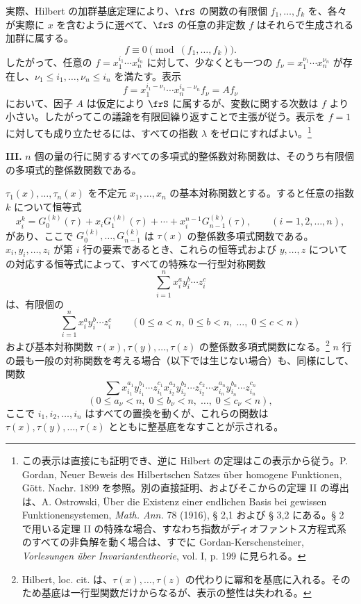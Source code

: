 \documentclass[11pt]{article}
\begin{document}
実際、Hilbert の加群基底定理により、\(\frS\) の関数の有限個 \(f_1,\ldots,f_k\) を、各々が実際に \(x\) を含むように選べて、\(\frS\) の任意の非定数 \(f\) はそれらで生成される加群に属する。
\[
        f\equiv0\pmod{(f_1,\ldots,f_k)}.
\]
したがって、任意の \(f=x_1^{i_1}\cdots x_n^{i_n}\) に対して、少なくとも一つの \(f_\nu=x_1^{\nu_1}\cdots x_n^{\nu_n}\) が存在し、\(\nu_1\le i_1,\ldots,\nu_n\le i_n\) を満たす。表示
\[
        f=x_1^{i_1-\nu_1}\cdots x_n^{i_n-\nu_n} f_\nu = A f_\nu
\]
において、因子 \(A\) は仮定により \(\frS\) に属するが、変数に関する次数は \(f\) より小さい。したがってこの議論を有限回繰り返すことで主張が従う。表示を \(f=1\) に対しても成り立たせるには、すべての指数 \(\lambda\) をゼロにすればよい。\footnote{この表示は直接にも証明でき、逆に Hilbert の定理はこの表示から従う。P. Gordan, Neuer Beweis des Hilbertschen Satzes über homogene Funktionen, Gött. Nachr. 1899 を参照。別の直接証明、およびそこからの定理 II の導出は、A. Ostrowski, Über die Existenz einer endlichen Basis bei gewissen Funktionensystemen, \emph{Math. Ann.} 78 (1916), § 2,1 および § 3,2 にある。§ 2 で用いる定理 II の特殊な場合、すなわち指数がディオファントス方程式系のすべての非負解を動く場合は、すでに Gordan-Kerschensteiner, \emph{Vorlesungen über Invariantentheorie}, vol. I, p. 199 に見られる。}

\textbf{III.} \(n\) 個の量の行に関するすべての多項式的整係数対称関数は、そのうち有限個の多項式的整係数関数である。

\(\tau_1(x),\ldots,\tau_n(x)\) を不定元 \(x_1,\ldots,x_n\) の基本対称関数とする。すると任意の指数 \(k\) について恒等式
\[
        x_i^k = G_0^{(k)}(\tau)+x_iG_1^{(k)}(\tau)+\cdots+x_i^{n-1}G_{n-1}^{(k)}(\tau),
        \qquad (i=1,2,\ldots,n),
\]
があり、ここで \(G_0^{(k)},\ldots,G_{n-1}^{(k)}\) は \(\tau(x)\) の整係数多項式関数である。\(x_i,y_i,\ldots,z_i\) が第 \(i\) 行の要素であるとき、これらの恒等式および \(y,\ldots,z\) についての対応する恒等式によって、すべての特殊な一行型対称関数
\[
        \sum_{i=1}^n x_i^{a}y_i^{b}\cdots z_i^{c}
\]
は、有限個の
\[
        \sum_{i=1}^n x_i^{a}y_i^{b}\cdots z_i^{c}
        \qquad
        (0\le a<n,\;0\le b<n,\;\ldots,\;0\le c<n)
\]
および基本対称関数 \(\tau(x),\tau(y),\ldots,\tau(z)\) の整係数多項式関数になる。\footnote{Hilbert, loc. cit. は、\(\tau(x),\ldots,\tau(z)\) の代わりに冪和を基底に入れる。そのため基底は一行型関数だけからなるが、表示の整性は失われる。}
\(n\) 行の最も一般の対称関数を考える場合（以下では生じない場合）も、同様にして、関数
\[
        \sum x_{i_1}^{a_1}y_{i_1}^{b_1}\cdots z_{i_1}^{c_1}
              x_{i_2}^{a_2}y_{i_2}^{b_2}\cdots z_{i_2}^{c_2}
              \cdots
              x_{i_n}^{a_n}y_{i_n}^{b_n}\cdots z_{i_n}^{c_n}
\]
\[
        (0\le a_\nu<n,\;0\le b_\nu<n,\;\ldots,\;0\le c_\nu<n),
\]
ここで \(i_1,i_2,\ldots,i_n\) はすべての置換を動くが、これらの関数は \(\tau(x),\tau(y),\ldots,\tau(z)\) とともに整基底をなすことが示される。
\end{document}
